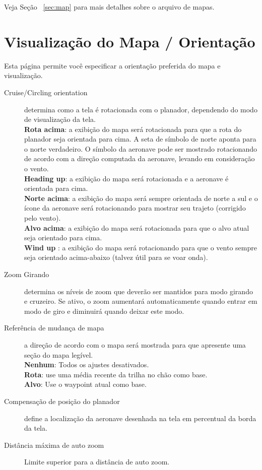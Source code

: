 Veja Seção ~\ref{sec:map} para mais detalhes sobre o arquivo de mapas.  


\section{Visualização do Mapa / Orientação}\label{sec:map-projection}

Esta página permite você especificar a orientação preferida do mapa e visualização.

\begin{description}
\item[Cruise/Circling orientation]  \label{conf:orientation} determina como a tela é rotacionada com o planador, dependendo do modo de visualização da tela.  \\
  {\bf Rota acima}: a exibição do mapa será rotacionada para que a rota do planador seja orientada para cima.  A seta de símbolo de norte aponta para o norte verdadeiro.  O símbolo da aeronave pode ser mostrado rotacionando de acordo com a direção computada da aeronave, levando em consideração o vento. \\
  {\bf Heading up}: a exibição do mapa será rotacionada e a aeronave é orientada para cima. \\
  {\bf Norte acima}: a exibição do mapa será sempre orientada de norte a sul e o ícone da aeronave será rotacionando para mostrar seu trajeto (corrigido pelo vento). \\
  {\bf Alvo acima}: a exibição do mapa será rotacionada para que o alvo atual seja orientado para cima. \\
  {\bf Wind up} :  a exibição do mapa será rotacionando para que o vento sempre seja orientado acima-abaixo (talvez útil para se voar onda).
\item[Zoom Girando]  \label{conf:circlingzoom} determina os níveis de zoom que deverão ser mantidos para modo girando e cruzeiro.  Se ativo, o zoom aumentará automaticamente quando entrar em modo de giro e diminuirá quando deixar este modo.
\item[Referência de mudança de mapa]  a direção de acordo com o mapa será mostrada para que apresente uma seção do mapa legível. \\
  {\bf Nenhum}: Todos os ajustes desativados. \\
  {\bf Rota}: use uma média recente da trilha no chão como base. \\
  {\bf Alvo}: Use o waypoint atual como base.
\item[Compensação de posição do planador]  \label{conf:gliderposition} define a localização da aeronave desenhada na tela em percentual da borda da tela.
\item[Distância máxima de auto zoom]  Limite superior para a distância de auto zoom.
\end{description}



